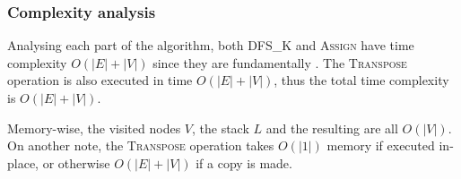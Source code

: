 \subsubsection{Complexity analysis}
Analysing each part of the algorithm, both \textsc{DFS\_K} and \textsc{Assign} have time complexity $O(|E|+|V|)$ since they are fundamentally . The \textsc{Transpose} operation is also executed in time $O(|E|+|V|)$, thus the total time complexity is $O(|E|+|V|)$.\par
Memory-wise, the visited nodes $V$, the stack $L$ and the resulting  are all $O(|V|)$. On another note, the \textsc{Transpose} operation takes $O(|1|)$ memory if executed in-place, or otherwise $O(|E|+|V|)$ if a copy is made.


